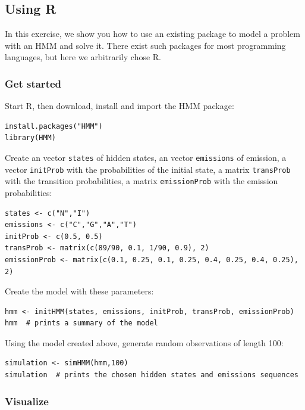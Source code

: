 \documentclass[a4paper,11pt]{article}
\begin{document}
\newpage

\subsection{Using R}

In this exercise, we show you how to use an existing package to model a problem with an HMM and solve it. There exist such packages for most programming languages, but here we arbitrarily chose R.

\subsubsection{Get started}

Start R, then download, install and import the HMM package:

\begin{verbatim}
install.packages("HMM")
library(HMM)
\end{verbatim}

Create an vector \texttt{states} of hidden states, an vector \texttt{emissions} of emission, a vector \texttt{initProb} with the probabilities of the initial state, a matrix \texttt{transProb} with the transition probabilities, a matrix \texttt{emissionProb} 
with the emission probabilities:

\begin{verbatim}
states <- c("N","I")
emissions <- c("C","G","A","T")
initProb <- c(0.5, 0.5)
transProb <- matrix(c(89/90, 0.1, 1/90, 0.9), 2)
emissionProb <- matrix(c(0.1, 0.25, 0.1, 0.25, 0.4, 0.25, 0.4, 0.25), 2)
\end{verbatim}

Create the model with these parameters:

\begin{verbatim}
hmm <- initHMM(states, emissions, initProb, transProb, emissionProb)
hmm  # prints a summary of the model
\end{verbatim}

Using the model created above, generate random observations of length 100:
\begin{verbatim}
simulation <- simHMM(hmm,100)
simulation  # prints the chosen hidden states and emissions sequences
\end{verbatim}

\subsubsection{Visualize}\label{plot}
\end{document}
